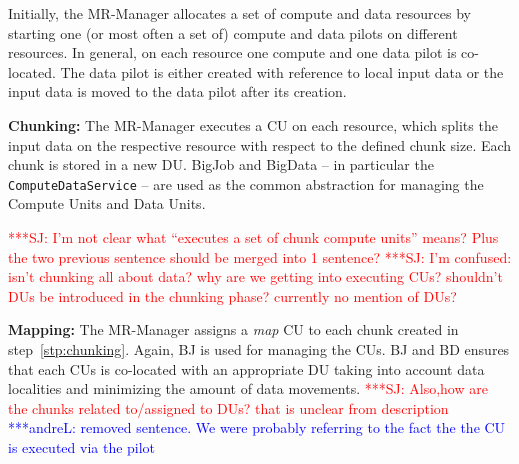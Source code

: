 \documentclass{sig-alternate}
\newcommand{\jhanote}[1]{ {\textcolor{red} { ***SJ: #1 }}}
\newcommand{\alnote}[1]{ {\textcolor{blue} { ***andreL: #1 }}}
\newcommand{\pnote}[1]{ {\textcolor{magenta} { ***pradeep: #1 }}}
\newcommand{\alnote}[1]{}
\newcommand{\pnote}[1]{}
\newcommand{\jhanote}[1]{}
\newcommand{\mrmg}{MR-Manager\xspace}
\newcommand{\computeunits}{Compute Units\xspace}
\newcommand{\cu}{CU\xspace}
\newcommand{\dataunits}{Data Units\xspace}
\begin{document}

\begin{compactenum}[A.]

\item Initially, the \mrmg allocates a set of compute and data
  resources by starting one (or most often a set of) compute and data
  pilots on different resources.  In general, on each resource one
  compute and one data pilot is co-located. The data pilot is either
  created with reference to local input data or the input data is
  moved to the data pilot after its creation.


\item \textbf{Chunking:} %
  The \mrmg executes a \cu on each resource, which splits the input
  data on the respective resource with respect to the defined chunk
  size.\label{stp:chunking} %
Each chunk is stored in a new DU. BigJob and BigData -- in particular
the \texttt{ComputeDataService} -- are used as the common abstraction
for managing the \computeunits and \dataunits. 
  
  \jhanote{I'm not clear what ``executes a set of chunk compute
    units'' means? Plus the two previous sentence should be merged
    into 1 sentence?} \jhanote{I'm confused: isn't chunking all about
    data? why are we getting into executing CUs? shouldn't DUs be
    introduced in the chunking phase? currently no mention of DUs?}

\item \textbf{Mapping:} The \mrmg assigns a {\it map} CU to each
  chunk created in step~\ref{stp:chunking}. Again, BJ is used for
  managing the CUs. BJ and BD ensures that each CUs is co-located with
  an appropriate DU taking into account data localities and minimizing
  the amount of data movements. %
\jhanote{Also,how are the chunks related to/assigned to DUs? that is
  unclear from description}\alnote{removed sentence. We were probably
  referring to the fact the the CU is executed via the pilot}
	

\end{compactenum}
\end{document}
